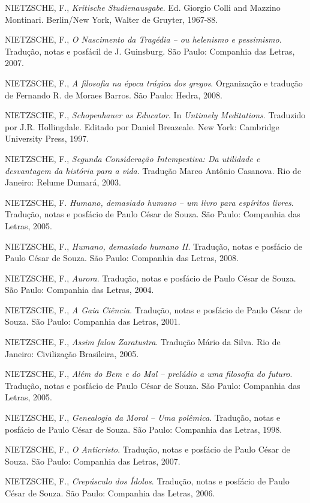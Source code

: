 \documentclass[
	12pt,				%
	openright,			%
	oneside,			%
	a4paper,			%
	english,			%
	french,				%
	spanish,			%
	brazil				%
	]{abntex2}
\begin{document}
NIETZSCHE, F., \textit{Kritische Studienausgabe}. Ed. Giorgio Colli and Mazzino Montinari. Berlin/New York, Walter de Gruyter, 1967-88.

NIETZSCHE, F., \textit{O Nascimento da Tragédia – ou helenismo e pessimismo}. Tradução, notas e posfácil de J. Guinsburg. São Paulo: Companhia das Letras, 2007.

NIETZSCHE, F., \textit{A filosofia na época trágica dos gregos}. Organização e tradução de Fernando R. de Moraes Barros. São Paulo: Hedra, 2008. 

NIETZSCHE, F., \textit{Schopenhauer as Educator}. In \textit{Untimely Meditations}. Traduzido por J.R. Hollingdale. Editado por Daniel Breazeale. New York: Cambridge University Press, 1997.

NIETZSCHE, F., \textit{Segunda Consideração Intempestiva: Da utilidade e desvantagem da história para a vida}. Tradução Marco Antônio Casanova. Rio de Janeiro: Relume Dumará, 2003.

NIETZSCHE, F. \textit{Humano, demasiado humano – um livro para espíritos livres}. Tradução, notas e posfácio de Paulo César de Souza. São Paulo: Companhia das Letras, 2005.

NIETZSCHE, F., \textit{Humano, demasiado humano II}. Tradução, notas e posfácio de Paulo César de Souza. São Paulo: Companhia das Letras, 2008.

NIETZSCHE, F., \textit{Aurora}. Tradução, notas e posfácio de Paulo César de Souza. São Paulo: Companhia das Letras, 2004.

NIETZSCHE, F., \textit{A Gaia Ciência}. Tradução, notas e posfácio de Paulo César de Souza. São Paulo: Companhia das Letras, 2001.

NIETZSCHE, F.,  \textit{Assim falou Zaratustra}. Tradução Mário da Silva. Rio de Janeiro: Civilização Brasileira, 2005.

NIETZSCHE, F., \textit{Além do Bem e do Mal – prelúdio a uma filosofia do futuro}. Tradução, notas e posfácio de Paulo César de Souza. São Paulo: Companhia das Letras, 2005. 

NIETZSCHE, F., \textit{Genealogia da Moral – Uma polêmica}. Tradução, notas e posfácio de Paulo César de Souza. São Paulo: Companhia das Letras, 1998.

NIETZSCHE, F., \textit{O Anticristo}. Tradução, notas e posfácio de Paulo César de Souza. São Paulo: Companhia das Letras, 2007.

NIETZSCHE, F., \textit{Crepúsculo dos Ídolos}. Tradução, notas e posfácio de Paulo César de Souza. São Paulo: Companhia das Letras, 2006.
\end{document}
